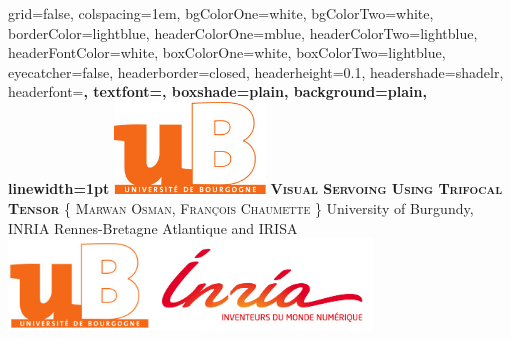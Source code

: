 \documentclass[landscape,final,a0paper,fontscale=0.285]{baposter}
\begin{document}
\begin{poster}%
  {
  grid=false,
  colspacing=1em,
  bgColorOne=white,
  bgColorTwo=white,
  borderColor=lightblue,
  headerColorOne=mblue,
  headerColorTwo=lightblue,
  headerFontColor=white,
  boxColorOne=white,
  boxColorTwo=lightblue,
  eyecatcher=false,
  headerborder=closed,
  headerheight=0.1\textheight,
  headershade=shadelr,
  headerfont=\Large\bf\textsc, %
  textfont={\setlength{\parindent}{1.5em}},
  boxshade=plain,
  background=plain,
  linewidth=1pt
  }
  {\includegraphics[height=6.6em]{figures/ublogo.jpg}}
  {\bf\textsc{Visual Servoing Using Trifocal Tensor}\vspace{0.5em}}
  {\textsc{\{ Marwan Osman, Fran\c{c}ois Chaumette \}} \small{\hspace{12pt} University of Burgundy, INRIA Rennes-Bretagne Atlantique and IRISA}} %
  {%
    \includegraphics[height=6.6em]{figures/ubinrialogo.jpg}
  }

    \newcommand{\colouredcircle}{%
      \tikz{\useasboundingbox (-0.2em,-0.32em) rectangle(0.2em,0.32em); \draw[draw=black,fill=lightblue,line width=0.03em] (0,0) circle(0.18em);}}


\end{poster}
\end{document}
